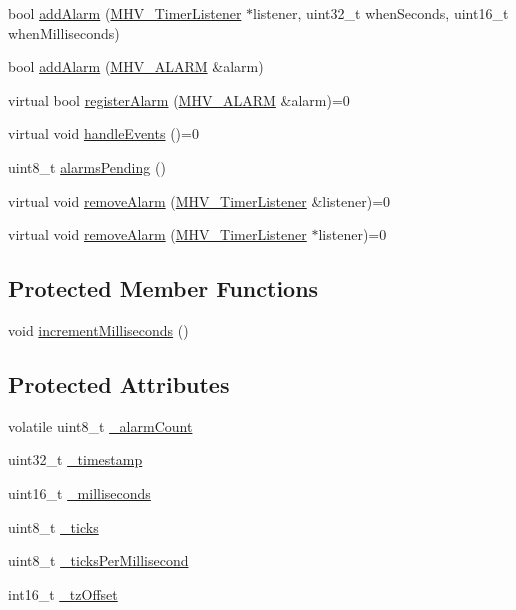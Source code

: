 \begin{DoxyCompactItemize}
\item 
bool \hyperlink{class_m_h_v___r_t_c_a64fab0fcc6e61e087c5424ef2e456d4a}{add\-Alarm} (\hyperlink{class_m_h_v___timer_listener}{\-M\-H\-V\-\_\-\-Timer\-Listener} $\ast$listener, uint32\-\_\-t when\-Seconds, uint16\-\_\-t when\-Milliseconds)
\item 
bool \hyperlink{class_m_h_v___r_t_c_ac58061c6f016d665a9027f8d55b9d5c0}{add\-Alarm} (\hyperlink{_m_h_v___r_t_c_8h_af13307658f41fba330ffae04dd5cbce6}{\-M\-H\-V\-\_\-\-A\-L\-A\-R\-M} \&alarm)
\item 
virtual bool \hyperlink{class_m_h_v___r_t_c_a9f602280028deadd62f71fc85c6115cc}{register\-Alarm} (\hyperlink{_m_h_v___r_t_c_8h_af13307658f41fba330ffae04dd5cbce6}{\-M\-H\-V\-\_\-\-A\-L\-A\-R\-M} \&alarm)=0
\item 
virtual void \hyperlink{class_m_h_v___r_t_c_a07fd618ada2e83e34632a637485fb59d}{handle\-Events} ()=0
\item 
uint8\-\_\-t \hyperlink{class_m_h_v___r_t_c_a78c9916568b91c43ba000a8fa851e3e5}{alarms\-Pending} ()
\item 
virtual void \hyperlink{class_m_h_v___r_t_c_a0a0d7e7449118faae9e3b9d2453196b0}{remove\-Alarm} (\hyperlink{class_m_h_v___timer_listener}{\-M\-H\-V\-\_\-\-Timer\-Listener} \&listener)=0
\item 
virtual void \hyperlink{class_m_h_v___r_t_c_a07000693b6d6f05b1a1b6fc12ebeb77b}{remove\-Alarm} (\hyperlink{class_m_h_v___timer_listener}{\-M\-H\-V\-\_\-\-Timer\-Listener} $\ast$listener)=0
\end{DoxyCompactItemize}
\subsection*{\-Protected \-Member \-Functions}
\begin{DoxyCompactItemize}
\item 
void \hyperlink{class_m_h_v___r_t_c_adfdc40d1583e116656b3ac0310270c33}{increment\-Milliseconds} ()
\end{DoxyCompactItemize}
\subsection*{\-Protected \-Attributes}
\begin{DoxyCompactItemize}
\item 
volatile uint8\-\_\-t \hyperlink{class_m_h_v___r_t_c_a953a79952c9fa5fde5d1dacbc03d3b46}{\-\_\-alarm\-Count}
\item 
uint32\-\_\-t \hyperlink{class_m_h_v___r_t_c_a6ac0d6f1b8985cd6113249693da50104}{\-\_\-timestamp}
\item 
uint16\-\_\-t \hyperlink{class_m_h_v___r_t_c_acd3e486b5e5ee1d8cf9d961c0fdbde57}{\-\_\-milliseconds}
\item 
uint8\-\_\-t \hyperlink{class_m_h_v___r_t_c_ab29c30f80f7234394299476c73f36baf}{\-\_\-ticks}
\item 
uint8\-\_\-t \hyperlink{class_m_h_v___r_t_c_a48e7d03e90e78881ed8833d6e4f77b36}{\-\_\-ticks\-Per\-Millisecond}
\item 
int16\-\_\-t \hyperlink{class_m_h_v___r_t_c_af9e544307713892ec196261247213490}{\-\_\-tz\-Offset}
\end{DoxyCompactItemize}


